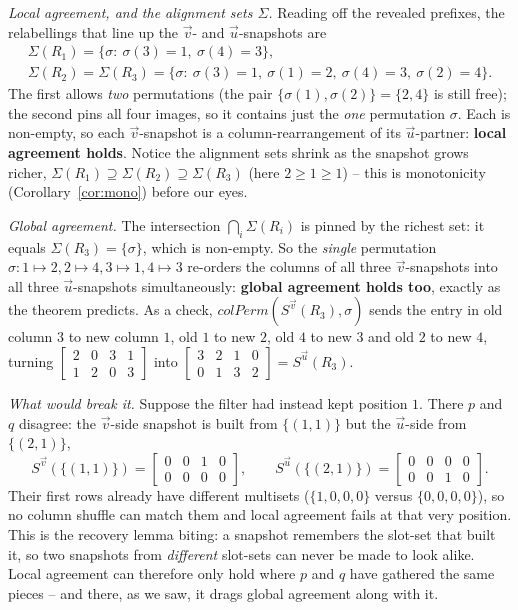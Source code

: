 \medskip\noindent\emph{Local agreement, and the alignment sets $\Sigma$.}
Reading off the revealed prefixes, the relabellings that line up the $\vec v$- and
$\vec u$-snapshots are
\begin{gather*}
\Sigma(R_1)=\{\sigma:\ \sigma(3)=1,\ \sigma(4)=3\},\\
\Sigma(R_2)=\Sigma(R_3)=\{\sigma:\ \sigma(3)=1,\ \sigma(1)=2,\ \sigma(4)=3,\ \sigma(2)=4\}.
\end{gather*}
The first allows \emph{two} permutations (the pair $\{\sigma(1),\sigma(2)\}=\{2,4\}$
is still free); the second pins all four images, so it contains just the \emph{one}
permutation $\sigma$.
Each is non-empty, so each $\vec v$-snapshot is a column-rearrangement of its
$\vec u$-partner: \textbf{local agreement holds}.  Notice the alignment sets shrink
as the snapshot grows richer,
$\Sigma(R_1)\supseteq\Sigma(R_2)\supseteq\Sigma(R_3)$ (here $2\ge1\ge1$) -- this is
monotonicity (Corollary~\ref{cor:mono}) before our eyes.

\medskip\noindent\emph{Global agreement.}
The intersection $\bigcap_i\Sigma(R_i)$ is pinned by the richest set: it equals
$\Sigma(R_3)=\{\sigma\}$, which is non-empty.  So the \emph{single} permutation
$\sigma:1\mapsto2,2\mapsto4,3\mapsto1,4\mapsto3$ re-orders the columns of all three
$\vec v$-snapshots into all three $\vec u$-snapshots simultaneously:
\textbf{global agreement holds too}, exactly as the theorem predicts.  As a check,
$colPerm(S^{\vec v}(R_3),\sigma)$ sends the entry in old column $3$ to new column
$1$, old $1$ to new $2$, old $4$ to new $3$ and old $2$ to new $4$, turning
$\left[\begin{smallmatrix}2&0&3&1\\1&2&0&3\end{smallmatrix}\right]$ into
$\left[\begin{smallmatrix}3&2&1&0\\0&1&3&2\end{smallmatrix}\right]=S^{\vec u}(R_3)$.

\medskip\noindent\emph{What would break it.}
Suppose the filter had instead kept position $1$.  There $p$ and $q$ disagree: the
$\vec v$-side snapshot is built from $\{(1,1)\}$ but the $\vec u$-side from
$\{(2,1)\}$,
\[
S^{\vec v}(\{(1,1)\})=\begin{bmatrix}0&0&1&0\\0&0&0&0\end{bmatrix},
\qquad
S^{\vec u}(\{(2,1)\})=\begin{bmatrix}0&0&0&0\\0&0&1&0\end{bmatrix}.
\]
Their first rows already have different multisets ($\{1,0,0,0\}$ versus
$\{0,0,0,0\}$), so no column shuffle can match them and local agreement fails at
that very position.  This is the recovery lemma biting: a snapshot remembers the
slot-set that built it, so two snapshots from \emph{different} slot-sets can never
be made to look alike.  Local agreement can therefore only hold where $p$ and $q$
have gathered the same pieces -- and there, as we saw, it drags global agreement
along with it.

